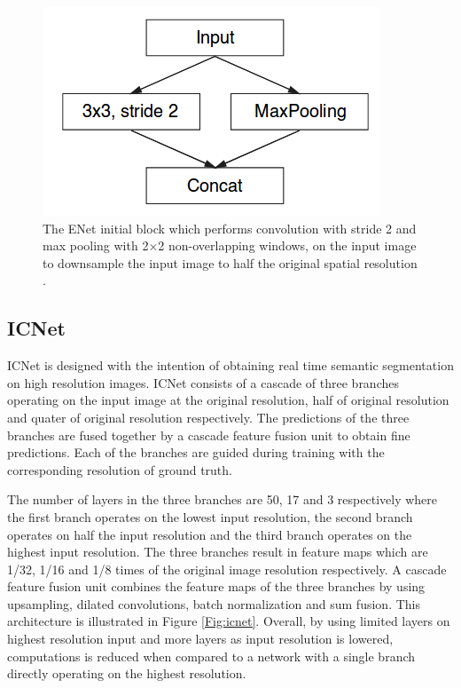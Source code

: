 	\begin{figure}
		\centering
		\includegraphics[width=.4\linewidth]{images/enet}
		\caption{The ENet initial block which performs convolution with stride 2 and max pooling with 2$\times$2 non-overlapping windows, on the input image to downsample the input image to half the original spatial resolution \cite{DBLP:journals/corr/PaszkeCKC16}.}
		\label{Fig:enet}
	\end{figure}

\subsection{ICNet}

ICNet \cite{DBLP:journals/corr/ZhaoQSSJ17} is designed with the intention of obtaining real time semantic segmentation on high resolution images. ICNet consists of a cascade of three branches operating on the input image at the original resolution, half of original resolution and quater of original resolution respectively. The predictions of the three branches are fused together by a cascade feature fusion unit to obtain fine predictions. Each of the branches are guided during training with the corresponding resolution of ground truth. 

The number of layers in the three branches are 50, 17 and 3 respectively where the first branch operates on the lowest input resolution, the second branch operates on half the input resolution and the third branch operates on the highest input resolution. The three branches result in feature maps which are 1/32, 1/16 and 1/8 times of the original image resolution respectively. A cascade feature fusion unit combines the feature maps of the three branches by using upsampling, dilated convolutions, batch normalization and sum fusion. This architecture is illustrated in Figure \ref{Fig:icnet}. Overall, by using limited layers on highest resolution input and more layers as input resolution is lowered, computations is reduced when compared to a network with a single branch directly operating on the highest resolution. 

